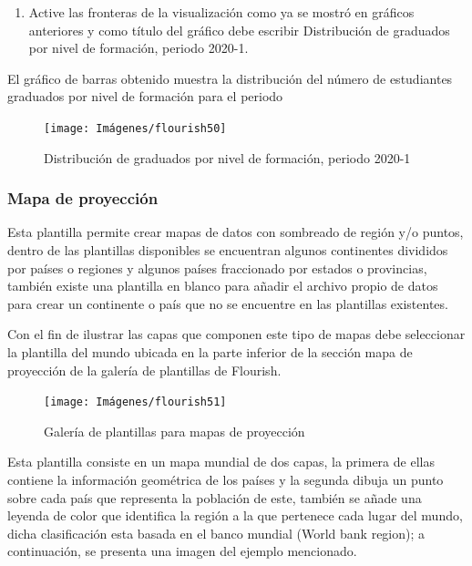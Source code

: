 \documentclass[
]{book}
\providecommand{\tightlist}{%
  \setlength{\itemsep}{0pt}\setlength{\parskip}{0pt}}
\begin{document}
\begin{enumerate}
\def\labelenumi{\arabic{enumi}.}
\setcounter{enumi}{8}
\tightlist
\item
  Active las fronteras de la visualización como ya se mostró en gráficos anteriores y como título del gráfico debe escribir Distribución de graduados por nivel de formación, periodo 2020-1.
\end{enumerate}

El gráfico de barras obtenido muestra la distribución del número de estudiantes graduados por nivel de formación para el periodo

\begin{figure}

{\centering \texttt{[image: Imágenes/flourish50]} 

}

\caption{Distribución de graduados por nivel de formación, periodo 2020-1}\label{fig:graficobarrasflourish-fig}
\end{figure}

\hypertarget{mapadeproyecciuxf3nflourish}{%
\subsubsection{Mapa de proyección}\label{mapadeproyecciuxf3nflourish}}

Esta plantilla permite crear mapas de datos con sombreado de región y/o puntos, dentro de las plantillas disponibles se encuentran algunos continentes divididos por países o regiones y algunos países fraccionado por estados o provincias, también existe una plantilla en blanco para añadir el archivo propio de datos para crear un continente o país que no se encuentre en las plantillas existentes.

Con el fin de ilustrar las capas que componen este tipo de mapas debe seleccionar la plantilla del mundo ubicada en la parte inferior de la sección mapa de proyección de la galería de plantillas de Flourish.

\begin{figure}

{\centering \texttt{[image: Imágenes/flourish51]} 

}

\caption{Galería de plantillas para mapas de proyección}\label{fig:plantillasmapaproyeccionflourish-fig}
\end{figure}

Esta plantilla consiste en un mapa mundial de dos capas, la primera de ellas contiene la información geométrica de los países y la segunda dibuja un punto sobre cada país que representa la población de este, también se añade una leyenda de color que identifica la región a la que pertenece cada lugar del mundo, dicha clasificación esta basada en el banco mundial (World bank region); a continuación, se presenta una imagen del ejemplo mencionado.
\end{document}
